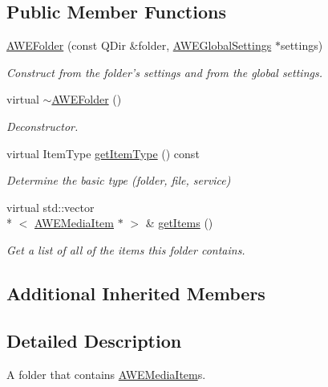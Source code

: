 \subsection*{Public Member Functions}
\begin{DoxyCompactItemize}
\item 
\hyperlink{class_a_w_e_folder_aa27ec223c9a9818e6bcfe738130d65ad}{A\-W\-E\-Folder} (const Q\-Dir \&folder, \hyperlink{class_a_w_e_global_settings}{A\-W\-E\-Global\-Settings} $\ast$settings)
\begin{DoxyCompactList}\small\item\em Construct from the folder's settings and from the global settings. \end{DoxyCompactList}\item 
\hypertarget{class_a_w_e_folder_a1faa4d437a820336c0d9dbaaf6324f3e}{virtual \hyperlink{class_a_w_e_folder_a1faa4d437a820336c0d9dbaaf6324f3e}{$\sim$\-A\-W\-E\-Folder} ()}\label{class_a_w_e_folder_a1faa4d437a820336c0d9dbaaf6324f3e}

\begin{DoxyCompactList}\small\item\em Deconstructor. \end{DoxyCompactList}\item 
virtual Item\-Type \hyperlink{class_a_w_e_folder_afa4834cc71bdef6c540ae134fa1ea6e0}{get\-Item\-Type} () const 
\begin{DoxyCompactList}\small\item\em Determine the basic type (folder, file, service) \end{DoxyCompactList}\item 
virtual std\-::vector\\*
$<$ \hyperlink{class_a_w_e_media_item}{A\-W\-E\-Media\-Item} $\ast$ $>$ \& \hyperlink{class_a_w_e_folder_a781cbc457376313c47c28b330a181c27}{get\-Items} ()
\begin{DoxyCompactList}\small\item\em Get a list of all of the items this folder contains. \end{DoxyCompactList}\end{DoxyCompactItemize}
\subsection*{Additional Inherited Members}


\subsection{Detailed Description}
A folder that contains {\ttfamily \hyperlink{class_a_w_e_media_item}{A\-W\-E\-Media\-Item}}s. 

